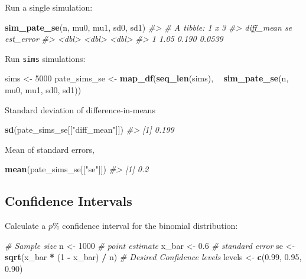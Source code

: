 \documentclass[]{book}
\newenvironment{Shaded}{\begin{snugshade}}{\end{snugshade}}
\newcommand{\KeywordTok}[1]{\textcolor[rgb]{0.13,0.29,0.53}{\textbf{#1}}}
\newcommand{\DecValTok}[1]{\textcolor[rgb]{0.00,0.00,0.81}{#1}}
\newcommand{\FloatTok}[1]{\textcolor[rgb]{0.00,0.00,0.81}{#1}}
\newcommand{\StringTok}[1]{\textcolor[rgb]{0.31,0.60,0.02}{#1}}
\newcommand{\CommentTok}[1]{\textcolor[rgb]{0.56,0.35,0.01}{\textit{#1}}}
\newcommand{\OperatorTok}[1]{\textcolor[rgb]{0.81,0.36,0.00}{\textbf{#1}}}
\newcommand{\NormalTok}[1]{#1}
\theoremstyle{definition}
\theoremstyle{definition}
\theoremstyle{definition}
\theoremstyle{remark}
\begin{document}
Run a single simulation:

\begin{Shaded}
\begin{Highlighting}[]
\KeywordTok{sim_pate_se}\NormalTok{(n, mu0, mu1, sd0, sd1)}
\CommentTok{#> # A tibble: 1 x 3}
\CommentTok{#>   diff_mean    se est_error}
\CommentTok{#>       <dbl> <dbl>     <dbl>}
\CommentTok{#> 1      1.05 0.190    0.0539}
\end{Highlighting}
\end{Shaded}

Run \texttt{sims} simulations:

\begin{Shaded}
\begin{Highlighting}[]
\NormalTok{sims <-}\StringTok{ }\DecValTok{5000}
\NormalTok{pate_sims_se <-}
\StringTok{  }\KeywordTok{map_df}\NormalTok{(}\KeywordTok{seq_len}\NormalTok{(sims), }\OperatorTok{~}\StringTok{ }\KeywordTok{sim_pate_se}\NormalTok{(n, mu0, mu1, sd0, sd1))}
\end{Highlighting}
\end{Shaded}

Standard deviation of difference-in-means

\begin{Shaded}
\begin{Highlighting}[]
\KeywordTok{sd}\NormalTok{(pate_sims_se[[}\StringTok{"diff_mean"}\NormalTok{]])}
\CommentTok{#> [1] 0.199}
\end{Highlighting}
\end{Shaded}

Mean of standard errors,

\begin{Shaded}
\begin{Highlighting}[]
\KeywordTok{mean}\NormalTok{(pate_sims_se[[}\StringTok{"se"}\NormalTok{]])}
\CommentTok{#> [1] 0.2}
\end{Highlighting}
\end{Shaded}

\subsection{Confidence Intervals}\label{confidence-intervals}

Calculate a \(p\%\) confidence interval for the binomial distribution:

\begin{Shaded}
\begin{Highlighting}[]
\CommentTok{# Sample size}
\NormalTok{n <-}\StringTok{ }\DecValTok{1000}
\CommentTok{# point estimate}
\NormalTok{x_bar <-}\StringTok{ }\FloatTok{0.6}
\CommentTok{# standard error}
\NormalTok{se <-}\StringTok{ }\KeywordTok{sqrt}\NormalTok{(x_bar }\OperatorTok{*}\StringTok{ }\NormalTok{(}\DecValTok{1} \OperatorTok{-}\StringTok{ }\NormalTok{x_bar) }\OperatorTok{/}\StringTok{ }\NormalTok{n)}
\CommentTok{# Desired Confidence levels}
\NormalTok{levels <-}\StringTok{ }\KeywordTok{c}\NormalTok{(}\FloatTok{0.99}\NormalTok{, }\FloatTok{0.95}\NormalTok{, }\FloatTok{0.90}\NormalTok{)}
\end{Highlighting}
\end{Shaded}
\end{document}
